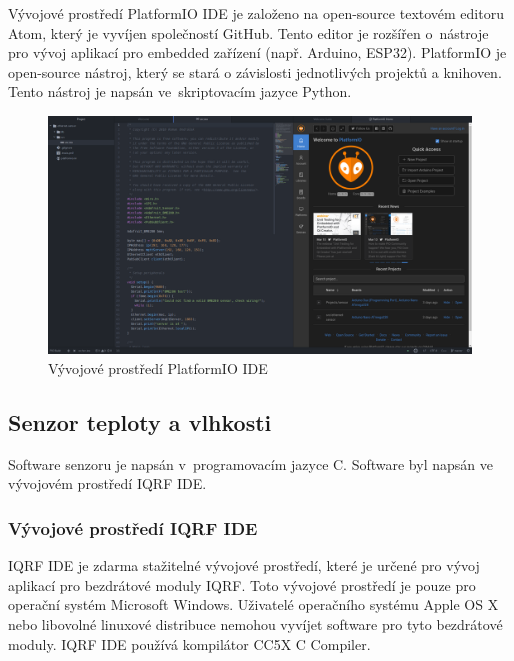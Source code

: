 \documentclass[12pt,a4paper]{article}
\begin{document}
Vývojové prostředí PlatformIO IDE je založeno na open-source textovém editoru Atom, který je vyvíjen společností GitHub. Tento editor je rozšířen o~nástroje pro vývoj aplikací pro embedded zařízení (např. Arduino, ESP32). PlatformIO je open-source nástroj, který se stará o závislosti jednotlivých projektů a knihoven. Tento nástroj je napsán ve~skriptovacím jazyce Python. 

\begin{figure}[H]
\centering
\label{fig:platformio-ide}
\includegraphics[width = 150mm]{img/platformio-ide.png}
\caption{Vývojové prostředí PlatformIO IDE}
\end{figure}

\newpage

\subsection{Senzor teploty a vlhkosti}

Software senzoru je napsán v~programovacím jazyce C. Software byl napsán ve vývojovém prostředí IQRF IDE\cite{iqrf/ide}.

\subsubsection{Vývojové prostředí IQRF IDE}

IQRF IDE\cite{iqrf/ide} je zdarma stažitelné vývojové prostředí, které je určené pro vývoj aplikací pro bezdrátové moduly IQRF. Toto vývojové prostředí je pouze pro operační systém Microsoft Windows. Uživatelé operačního systému Apple OS X nebo libovolné linuxové distribuce nemohou vyvíjet software pro tyto bezdrátové moduly. IQRF IDE používá kompilátor CC5X C Compiler\cite{sw/cc5x-compiler}.
\end{document}
